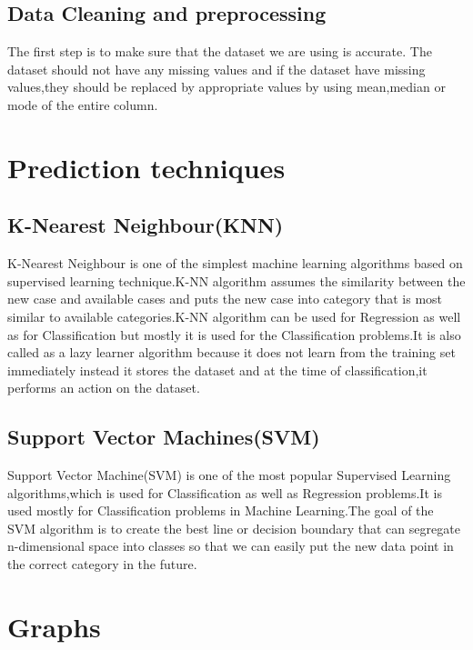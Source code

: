 \subsection*{Data Cleaning and preprocessing}
    The first step is to make sure that the dataset we are using is accurate. The dataset should not have any missing values and if the dataset have missing values,they should be replaced by appropriate values by using mean,median or mode of the entire column.
\section{Prediction techniques}
\subsection*{K-Nearest Neighbour(KNN)}
K-Nearest Neighbour is one of the simplest machine learning algorithms based on supervised learning technique.K-NN algorithm assumes the similarity between the new case and available cases and puts the new case into category that is most similar to available categories.K-NN algorithm can be used for Regression as well as for Classification but mostly it is used for the Classification problems.It is also called as a lazy learner algorithm because it does not learn from the training set immediately instead it stores the dataset and at the time of classification,it performs an action on the dataset.
\subsection*{Support Vector Machines(SVM)} 
Support Vector Machine(SVM) is one of the most popular Supervised Learning algorithms,which is used for Classification as well as Regression problems.It is used mostly for Classification problems in Machine Learning.The goal of the SVM algorithm is to create the best line or decision boundary that can segregate n-dimensional space into classes so that we can easily put the new data point in the correct category in the future.
\section{Graphs}
